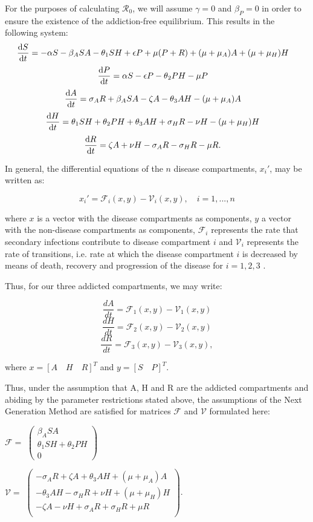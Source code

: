 \documentclass[12pt]{article}
\begin{document}
For the purposes of calculating $\mathscr{R}_0$, we will assume $\gamma =0$ and $\beta_{P} =0$ in order to ensure the existence of the addiction-free equilibrium. This results in the following system:
\[\dv{S}{t} = -\alpha S - \beta_{A} SA  - \theta_{1} SH +\epsilon P +\mu (P+R) + (\mu+\mu_{A})A + (\mu+\mu_{H}) H \quad \] 
\[\dv{P}{t} = \alpha S - \epsilon P  - \theta_{2}PH- \mu P    \quad\]
\[\dv{A}{t} = \sigma_{A} R +\beta_{A} SA  -\zeta A - \theta_{3}AH-(\mu + \mu_{A})A   \quad\]
\[\dv{H}{t} = \theta_{1}SH+\theta_{2}PH+\theta_{3}AH + \sigma_{H}R-\nu H-(\mu+\mu_{H})H  \quad\]
\[\dv{R}{t} = \zeta A +\nu H -\sigma_{A}R-\sigma_{H}R -\mu R.\quad\]


In general, the differential equations of the $n$ disease compartments, $x_i'$, may be written as: 

\[{x_i'} = \mathscr{F}_{i} (x,y)-\mathscr{V}_i (x,y),\quad i=1,...,n\] 

where $x$ is a vector with the disease compartments as components, $y$ a vector with the non-disease compartments as components, $\mathscr{F}_{i}$ represents the rate that secondary infections contribute to disease compartment $i$ and $\mathscr{V}_{i}$ represents the rate of transitions, i.e. rate at which the disease compartment $i$ is decreased by means of death, recovery and progression of the disease for $i=1,2,3$ \cite{Driessche}. 

Thus, for our three addicted compartments, we may write: 

$$\dfrac{dA}{dt} = \mathscr{F}_{1} (x,y)-\mathscr{V}_{1}(x,y)$$
$$\dfrac{dH}{dt} = \mathscr{F}_{2} (x,y)-\mathscr{V}_{2}(x,y)$$
$$\dfrac{dR}{dt} = \mathscr{F}_{3} (x,y)-\mathscr{V}_{3}(x,y),$$

where $x= {[A\quad H\quad R]}^{T}$ and $y= {[S\quad P]}^{T}$.



Thus, under the assumption that A, H and R are the addicted compartments and abiding by the parameter restrictions stated above, the assumptions of the Next Generation Method are satisfied for matrices $\mathscr{F}$ and $\mathscr{V}$ formulated here:

\begin{center}
$\mathscr{F}=$
$ \begin{pmatrix}

\beta_{A} SA \\
\theta_{1}SH+\theta_{2}PH \\
0
\end{pmatrix}$



$\mathscr{V}=$
$ \begin{pmatrix}

-\sigma_{A}R+\zeta A+\theta_{3} AH + (\mu +\mu_{A})A \\
-\theta_{3}AH-\sigma_{H}R+\nu H +(\mu +\mu_{H}) H \\
-\zeta A -\nu H +\sigma_{A}R +\sigma_{H}R +\mu R\\
\end{pmatrix}$.
\end{center}
\end{document}
